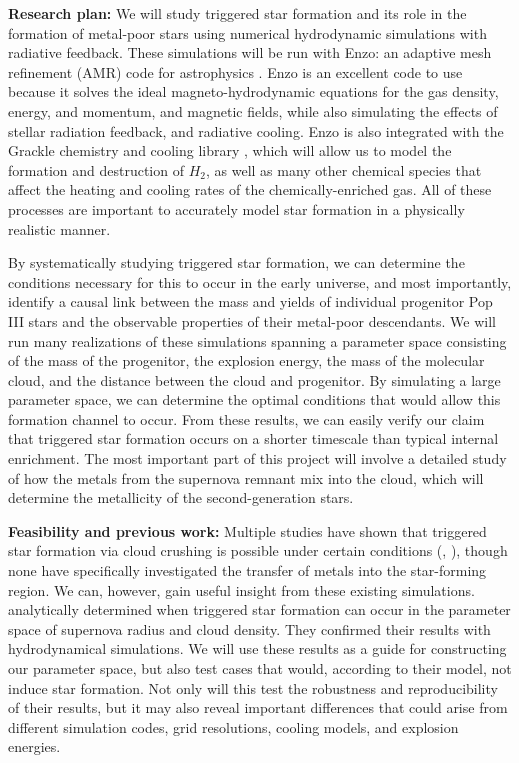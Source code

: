 \documentclass[letterpaper, 12pt]{article}
\begin{document}
\textbf{Research plan:} We will study triggered star formation and its role in the formation of metal-poor stars using numerical hydrodynamic simulations with radiative feedback. These simulations will be run with Enzo: an adaptive mesh refinement (AMR) code for astrophysics \citep{Bryan2014}. Enzo is an excellent code to use because it solves the ideal magneto-hydrodynamic equations for the gas density, energy, and momentum, and magnetic fields, while also simulating the effects of stellar radiation feedback, and radiative cooling. Enzo is also integrated with the Grackle chemistry and cooling library \citep{Smith2017}, which will allow us to model the formation and destruction of $H_2$, as well as many other chemical species that affect the heating and cooling rates of the chemically-enriched gas. All of these processes are important to accurately model star formation in a physically realistic manner. 

By systematically studying triggered star formation, we can determine the conditions necessary for this to occur in the early universe, and most importantly, identify a causal link between the mass and yields of individual progenitor Pop III stars and the observable properties of their metal-poor descendants. We will run many realizations of these simulations spanning a parameter space consisting of the mass of the progenitor, the explosion energy, the mass of the molecular cloud, and the distance between the cloud and progenitor. By simulating a large parameter space, we can determine the optimal conditions that would allow this formation channel to occur. From these results, we can easily verify our claim that triggered star formation occurs on a shorter timescale than typical internal enrichment. The most important part of this project will involve a detailed study of how the metals from the supernova remnant mix into the cloud, which will determine the metallicity of the second-generation stars.

\textbf{Feasibility and previous work:} Multiple studies have shown that triggered star formation via cloud crushing is possible under certain conditions (\cite{Melioli2006}, \cite{Leao2009}), though none have specifically investigated the transfer of metals into the star-forming region. We can, however, gain useful insight from these existing simulations. \cite{Melioli2006} analytically determined when triggered star formation can occur in the parameter space of supernova radius and cloud density. They confirmed their results with hydrodynamical simulations. We will use these results as a guide for constructing our parameter space, but also test cases that would, according to their model, not induce star formation. Not only will this test the robustness and reproducibility of their results, but it may also reveal important differences that could arise from different simulation codes, grid resolutions, cooling models, and explosion energies.
\end{document}
